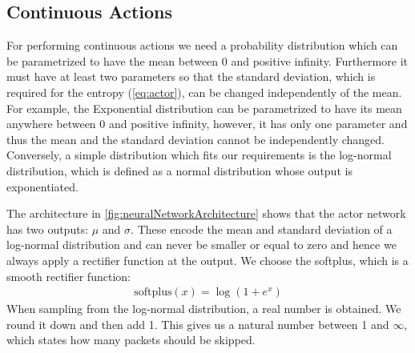\documentclass[conference]{IEEEtran}
\newcommand\note[2]{{\color{#1}#2}}
\begin{document}

\subsection{Continuous Actions}

For performing continuous actions we need a probability distribution which can be parametrized to have the mean between 0 and positive infinity. Furthermore it must have at least two parameters so that the standard deviation, which is required for the entropy (\autoref{eq:actor}), can be changed independently of the mean. For example, the Exponential distribution can be parametrized to have its mean anywhere between 0 and positive infinity, however, it has only one parameter and thus the mean and the standard deviation cannot be independently changed. Conversely, a simple distribution which fits our requirements is the log-normal distribution, which is defined as a normal distribution whose output is exponentiated.


The architecture in \autoref{fig:neuralNetworkArchitecture} shows that the actor network has two outputs: $\mu$ and $\sigma$. These encode the mean and standard deviation of a log-normal distribution and can never be smaller or equal to zero and hence we always apply a rectifier function at the output. We choose the softplus, which is a smooth rectifier function:
\begin{align}
\text{softplus}(x) = \log\left(1 + e^x \right)
\end{align}
When sampling from the log-normal distribution, a real number is obtained. We round it down and then add 1. This gives us a natural number between 1 and $\infty$, which states how many packets should be skipped. 
\end{document}

